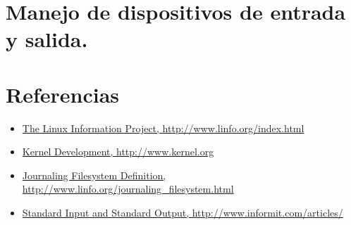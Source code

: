 \documentclass[paper=a4, fontsize=12pt]{article} 		%
\numberwithin{equation}{section}						%
\numberwithin{table}{section} 							%
\begin{document}
\section{Manejo de dispositivos de entrada y salida.}
\begin{figure}[H]
 	\centering
\end{figure}
\section{Referencias}
\begin{itemize}
\item  \hyperref[http://www.linfo.org/index.html]{The Linux Information Project,  http://www.linfo.org/index.html}
\item  \hyperref[http://kernel.org]{Kernel Development,  http://www.kernel.org}
\item  \hyperref[http://www.linfo.org/journaling_filesystem.html]{Journaling Filesystem Definition, http://www.linfo.org/journaling\_filesystem.html}
\item  \hyperref[http://www.informit.com/articles/article.aspx?p=2273593&seqNum=5]{Standard Input and Standard Output, http://www.informit.com/articles/}
\end{itemize}
\end{document}
